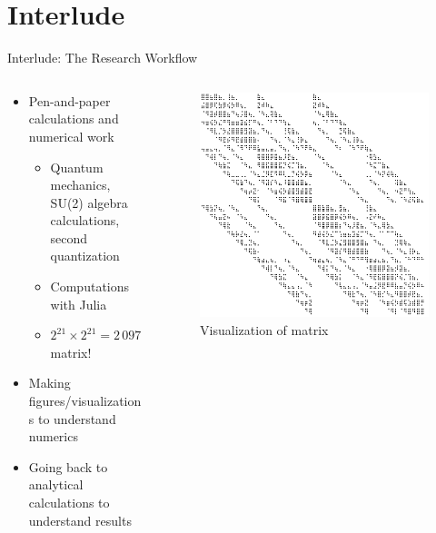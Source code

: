 \documentclass{beamer}
\begin{document}
\section{Interlude}
\begin{frame}{Interlude: The Research Workflow}
	\begin{columns}
	\begin{column}{0.6\textwidth}
	\begin{itemize}
	\item<+-> Pen-and-paper calculations and numerical work 
		\begin{itemize}
		\item<+-> Quantum mechanics, SU(2) algebra calculations, second quantization
		\item<+-> Computations with Julia 
		\item<+-> $ 2^{21} \times 2^{21} = 2\, 097\, 152 \times 2\, 097\, 152 $
		matrix!
		\end{itemize}
	\item<+-> Making figures/visualizations to understand numerics
	\item<+-> Going back to analytical calculations to understand results
	\end{itemize}
\end{column}
\begin{column}{0.4\textwidth} %
\begin{center}
	\begin{figure}[h]
		\captionsetup{labelformat=empty}
		\centering
		\includegraphics[width=1\textwidth]{figs/matrix_example_inverted.png}
		\caption{\footnotesize Visualization of matrix}
	\end{figure}
\end{center}
\end{column}
\end{columns}
\end{frame}
\end{document}
